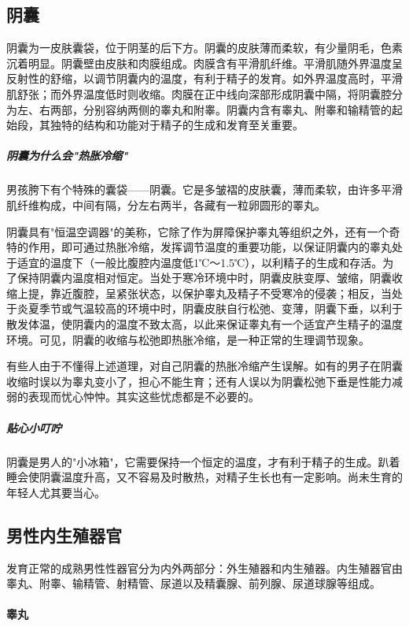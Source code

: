 \subsection{阴囊}

阴囊为一皮肤囊袋，位于阴茎的后下方。阴囊的皮肤薄而柔软，有少量阴毛，色素沉着明显。阴囊壁由皮肤和肉膜组成。肉膜含有平滑肌纤维。平滑肌随外界温度呈反射性的舒缩，以调节阴囊内的温度，有利于精子的发育。如外界温度高时，平滑肌舒张；而外界温度低时则收缩。肉膜在正中线向深部形成阴囊中隔，将阴囊腔分为左、右两部，分别容纳两侧的睾丸和附睾。阴囊内含有睾丸、附睾和输精管的起始段，其独特的结构和功能对于精子的生成和发育至关重要。

\subparagraph{阴囊为什么会"热胀冷缩"}

男孩胯下有个特殊的囊袋——阴囊。它是多皱褶的皮肤囊，薄而柔软，由许多平滑肌纤维构成，中间有隔，分左右两半，各藏有一粒卵圆形的睪丸。

阴囊具有"恒温空调器"的美称，它除了作为屏障保护睾丸等组织之外，还有一个奇特的作用，即可通过热胀冷缩，发挥调节温度的重要功能，以保证阴囊内的睾丸处于适宜的温度下（一般比腹腔内温度低1℃～1.5℃），以利精子的生成和存活。为了保持阴囊内温度相对恒定。当处于寒冷环境中时，阴囊皮肤变厚、皱缩，阴囊收缩上提，靠近腹腔，呈紧张状态，以保护睾丸及精子不受寒冷的侵袭；相反，当处于炎夏季节或气温较高的环境中时，阴囊皮肤自行松弛、变薄，阴囊下垂，以利于散发体温，使阴囊内的温度不致太高，以此来保证睾丸有一个适宜产生精子的温度环境。可见，阴囊的收缩与松弛即热胀冷缩，是一种正常的生理调节现象。

有些人由于不懂得上述道理，对自己阴囊的热胀冷缩产生误解。如有的男子在阴囊收缩时误以为睾丸变小了，担心不能生育；还有人误以为阴囊松弛下垂是性能力减弱的表现而忧心忡忡。其实这些忧虑都是不必要的。

\subparagraph{贴心小叮咛}

阴囊是男人的"小冰箱"，它需要保持一个恒定的温度，才有利于精子的生成。趴着睡会使阴囊温度升高，又不容易及时散热，对精子生长也有一定影响。尚未生育的年轻人尤其要当心。

\subsection{男性内生殖器官}

发育正常的成熟男性性器官分为内外两部分：外生殖器和内生殖器。内生殖器官由睾丸、附睾、输精管、射精管、尿道以及精囊腺、前列腺、尿道球腺等组成。

\paragraph{睾丸}

